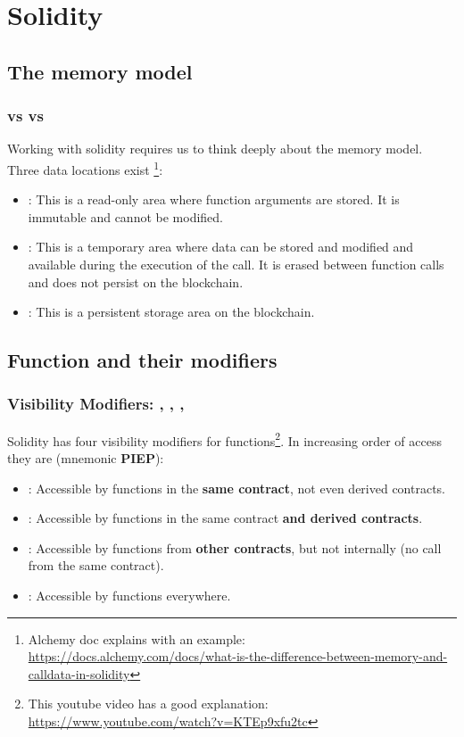 
\chapter{Solidity}

\section{The memory model}

\subsection{ vs  vs }
\label{sec:soliditity-memory-model}
Working with solidity requires us to think deeply about the memory model. Three data locations exist \footnote{ Alchemy doc explains with an example: \href{https://docs.alchemy.com/docs/what-is-the-difference-between-memory-and-calldata-in-solidity}{https://docs.alchemy.com/docs/what-is-the-difference-between-memory-and-calldata-in-solidity} 
}:
\begin{itemize}
    \item {}: This is a read-only area where function arguments are stored. It is immutable and cannot be modified.
    \item {}: This is a temporary area where data can be stored and modified and available during the execution of the call. It is erased between function calls and does not persist on the blockchain.
    \item {}: This is a persistent storage area on the blockchain.
\end{itemize}

\section{Function and their modifiers}

\subsection{Visibility Modifiers: , , , }
Solidity has four visibility modifiers for functions\footnote{This youtube video has a good explanation: \href{https://www.youtube.com/watch?v=KTEp9xfu2tc}{https://www.youtube.com/watch?v=KTEp9xfu2tc}}. In increasing order of access they are (mnemonic \textbf{PIEP}):

\begin{itemize}
    \item {}: Accessible by functions in the \textbf{same contract}, not even derived contracts.
    \item {}: Accessible by functions in the same contract \textbf{and derived contracts}.
    \item {}: Accessible by functions from \textbf{other contracts}, but not internally (no call from the same contract).
    \item {}: Accessible by functions everywhere.
\end{itemize}

